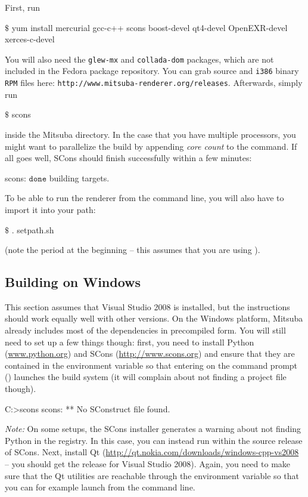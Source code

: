 First, run
\begin{shell}
$\text{\$}$ yum install mercurial gcc-c++ scons boost-devel qt4-devel OpenEXR-devel xerces-c-devel
\end{shell}
You will also need the \texttt{glew-mx} and \texttt{collada-dom} packages, which are not included in the Fedora package repository. You can grab source and \texttt{i386} binary \texttt{RPM} files here: \texttt{http://www.mitsuba-renderer.org/releases}.
Afterwards, simply run
\begin{shell}
$\text{\$}$ scons
\end{shell}
inside the Mitsuba directory. In the case that you have multiple processors, you might want to parallelize the build by appending \emph{core count} to the command.
If all goes well, SCons should finish successfully within a few minutes:
\begin{shell}
scons: $\texttt{done}$ building targets.
\end{shell}
To be able to run the renderer from the command line, you will also have to import it into your path:
\begin{shell}
$\text{\$}$ . setpath.sh
\end{shell}
(note the period at the beginning -- this assumes that you are using ).


\subsection{Building on Windows}
This section assumes that Visual Studio 2008 is installed, but the instructions should work equally well with other versions.
On the Windows platform, Mitsuba already includes most of the dependencies in precompiled form.
You will still need to set up a few things though: first, you need to install Python 
(\url{www.python.org}) and SCons (\url{http://www.scons.org}) and ensure that they are contained
in the  environment variable so that entering  on the command prompt
() launches the build system (it will complain about not finding a project file though).
\begin{shell}
C:\Users\Wenzel>scons
scons: ** No SConstruct file found.
\end{shell}
\emph{Note: }On some setups, the SCons installer generates a warning about not finding Python in the registry. In this case, you can instead run  within the source release of SCons.
Next, install Qt (\url{http://qt.nokia.com/downloads/windows-cpp-vs2008} -- you should get the release for Visual Studio 2008). Again, you need to make sure that the 
Qt utilities are reachable through the  environment variable so that you can for example launch  from the command line.

